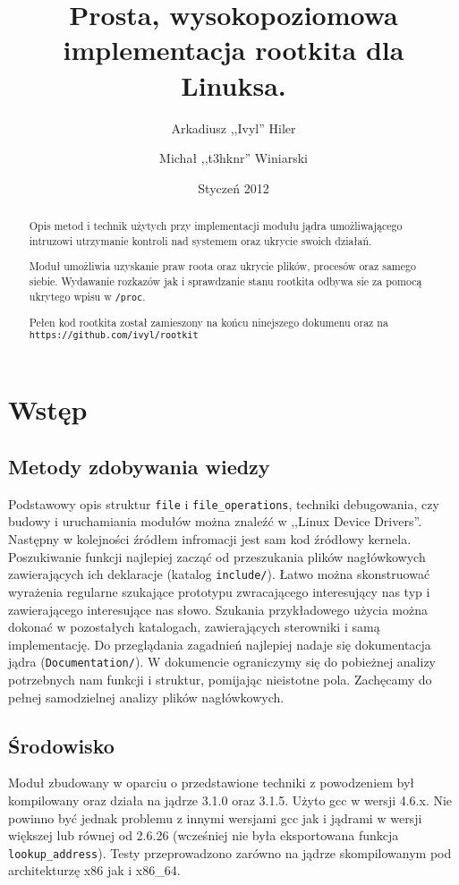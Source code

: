 \documentclass[a4paper]{article}
\begin{document}
\title{Prosta, wysokopoziomowa implementacja rootkita dla Linuksa.}
\author{Arkadiusz ,,Ivyl'' Hiler \and Michał ,,t3hknr'' Winiarski}
\date{Styczeń 2012}
\maketitle
\newpage
\begin{abstract}
Opis metod i technik użytych przy implementacji modułu jądra umożliwającego intruzowi utrzymanie kontroli nad systemem
oraz ukrycie swoich działań.

Moduł umożliwia uzyskanie praw roota oraz ukrycie plików, procesów oraz samego siebie. 
Wydawanie rozkazów jak i sprawdzanie stanu rootkita odbywa sie za pomocą ukrytego wpisu w \texttt{/proc}.

Pełen kod rootkita został zamieszony na końcu ninejszego dokumenu oraz na
\texttt{https://github.com/ivyl/rootkit}
\end{abstract}

\newpage
\tableofcontents
\newpage

\section{Wstęp}
\subsection{Metody zdobywania wiedzy}
Podstawowy opis struktur \texttt{file} i \texttt{file\_operations}, techniki
debugowania, czy budowy i uruchamiania modułów można znaleźć w ,,Linux Device
Drivers''\cite{ldd3}. Następny w kolejności źródłem infromacji jest sam kod
źródłowy kernela. Poszukiwanie funkcji najlepiej zacząć od przeszukania plików
nagłówkowych zawierających ich deklaracje (katalog \texttt{include/}). Łatwo
można skonstruować wyrażenia regularne szukające prototypu zwracającego
interesujący nas typ i zawierającego interesujące nas słowo. Szukania
przykładowego użycia można dokonać w pozostałych katalogach, zawierających
sterowniki i samą implementację. Do przeglądania zagadnień najlepiej nadaje
się dokumentacja jądra (\texttt{Documentation/}). W dokumencie ograniczymy się
do pobieżnej analizy potrzebnych nam funkcji i struktur, pomijając nieistotne
pola. Zachęcamy do pełnej samodzielnej analizy plików nagłówkowych.


\subsection{Środowisko}
Moduł zbudowany w oparciu o przedstawione techniki z powodzeniem był
kompilowany oraz działa na jądrze 3.1.0 oraz 3.1.5. Użyto gcc w wersji 4.6.x.
Nie powinno być jednak problemu z innymi wersjami gcc jak i jądrami w wersji
większej lub równej od 2.6.26 (wcześniej nie była eksportowana funkcja
\texttt{lookup\_address}). Testy przeprowadzono zarówno na jądrze
skompilowanym pod architekturzę x86 jak i x86\_64.
\end{document}
